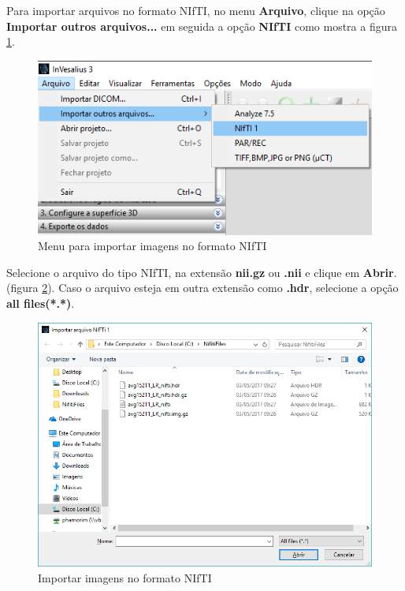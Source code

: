 Para importar arquivos no formato NIfTI, no menu \textbf{Arquivo}, clique na opção \textbf{Importar outros arquivos...} em seguida a opção \textbf{NIfTI} como mostra a figura \ref{fig:import_nifti_menu_pt}.

\begin{figure}[!htb]
\centering
\includegraphics[scale=0.4]{../user_guide_figures/invesalius_screen/import_nifti_menu_pt.png}
\caption{Menu para importar imagens no formato NIfTI}
\label{fig:import_nifti_menu_pt}
\end{figure}

Selecione o arquivo do tipo NIfTI, na extensão \textbf{nii.gz} ou \textbf{.nii} e clique em \textbf{Abrir}. (figura \ref{fig:import_nifti_window_pt}). Caso o arquivo esteja em outra extensão como \textbf{.hdr}, selecione a opção \textbf{all files(*.*)}.

\begin{figure}[!htb]
\centering
\includegraphics[scale=0.4]{../user_guide_figures/invesalius_screen/import_nifti_window_pt.png}
\caption{Importar imagens no formato NIfTI}
\label{fig:import_nifti_window_pt}
\end{figure}

